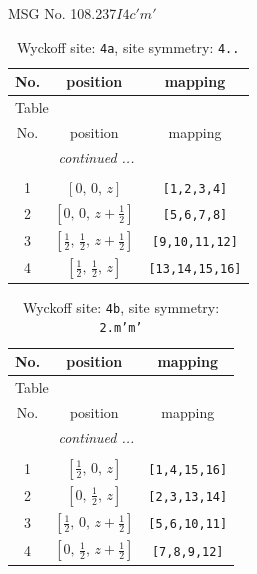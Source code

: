 \documentclass[fleqn,8pt]{jsarticle}
\begin{document}
\setcounter{MaxMatrixCols}{32}

\renewcommand{\tablename}{Table~}
\renewcommand{\figurename}{Figure~}
\begin{center}
\LARGE
MSG No. 108.237\quad$I4c'm'$
\end{center}
\renewcommand{\arraystretch}{1.2}
\begin{longtable}{ccc}
\caption{Wyckoff site: {\tt 4a}, site symmetry: {\tt 4..}}
 \\
 \hline \hline
No. & position & mapping \\ \hline \endfirsthead

\multicolumn{2}{l}{\tablename\ \thetable{}} \\
 \hline \hline
No. & position & mapping \\ \hline \endhead

 \hline \hline
\multicolumn{2}{r}{\footnotesize\it continued ...} \\ \endfoot

 \hline \hline
\multicolumn{2}{r}{} \\ \endlastfoot

1 & $\left[ 0,\, 0,\, z \right]$ & {\tt [1,2,3,4]} \\ \hline
2 & $\left[ 0,\, 0,\, z + \frac{1}{2} \right]$ & {\tt [5,6,7,8]} \\ \hline
3 & $\left[ \frac{1}{2},\, \frac{1}{2},\, z + \frac{1}{2} \right]$ & {\tt [9,10,11,12]} \\ \hline
4 & $\left[ \frac{1}{2},\, \frac{1}{2},\, z \right]$ & {\tt [13,14,15,16]} \\
\end{longtable}
\renewcommand{\arraystretch}{1.2}
\begin{longtable}{ccc}
\caption{Wyckoff site: {\tt 4b}, site symmetry: {\tt 2.m'm'}}
 \\
 \hline \hline
No. & position & mapping \\ \hline \endfirsthead

\multicolumn{2}{l}{\tablename\ \thetable{}} \\
 \hline \hline
No. & position & mapping \\ \hline \endhead

 \hline \hline
\multicolumn{2}{r}{\footnotesize\it continued ...} \\ \endfoot

 \hline \hline
\multicolumn{2}{r}{} \\ \endlastfoot

1 & $\left[ \frac{1}{2},\, 0,\, z \right]$ & {\tt [1,4,15,16]} \\ \hline
2 & $\left[ 0,\, \frac{1}{2},\, z \right]$ & {\tt [2,3,13,14]} \\ \hline
3 & $\left[ \frac{1}{2},\, 0,\, z + \frac{1}{2} \right]$ & {\tt [5,6,10,11]} \\ \hline
4 & $\left[ 0,\, \frac{1}{2},\, z + \frac{1}{2} \right]$ & {\tt [7,8,9,12]} \\
\end{longtable}
\end{document}
